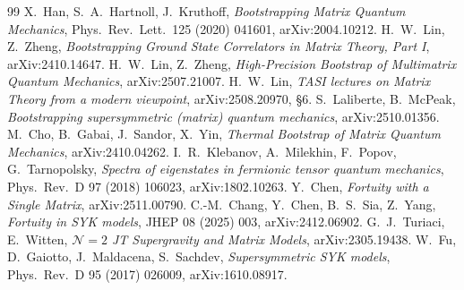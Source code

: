 \documentclass[10pt,a4paper]{article}
\begin{document}
\begin{thebibliography}{99}\small
{} X.~Han, S.~A.~Hartnoll, J.~Kruthoff, \emph{Bootstrapping Matrix Quantum Mechanics}, Phys.\ Rev.\ Lett.\ 125 (2020) 041601, arXiv:2004.10212.
 H.~W.~Lin, Z.~Zheng, \emph{Bootstrapping Ground State Correlators in Matrix Theory, Part I}, arXiv:2410.14647.
 H.~W.~Lin, Z.~Zheng, \emph{High-Precision Bootstrap of Multimatrix Quantum Mechanics}, arXiv:2507.21007.
 H.~W.~Lin, \emph{TASI lectures on Matrix Theory from a modern viewpoint}, arXiv:2508.20970, \S6.
 S.~Laliberte, B.~McPeak, \emph{Bootstrapping supersymmetric (matrix) quantum mechanics}, arXiv:2510.01356.
 M.~Cho, B.~Gabai, J.~Sandor, X.~Yin, \emph{Thermal Bootstrap of Matrix Quantum Mechanics}, arXiv:2410.04262.
 I.~R.~Klebanov, A.~Milekhin, F.~Popov, G.~Tarnopolsky, \emph{Spectra of eigenstates in fermionic tensor quantum mechanics}, Phys.\ Rev.\ D 97 (2018) 106023, arXiv:1802.10263.
 Y.~Chen, \emph{Fortuity with a Single Matrix}, arXiv:2511.00790.
 C.-M.~Chang, Y.~Chen, B.~S.~Sia, Z.~Yang, \emph{Fortuity in SYK models}, JHEP 08 (2025) 003, arXiv:2412.06902.
 G.~J.~Turiaci, E.~Witten, \emph{$\mathcal N=2$ JT Supergravity and Matrix Models}, arXiv:2305.19438.
 W.~Fu, D.~Gaiotto, J.~Maldacena, S.~Sachdev, \emph{Supersymmetric SYK models}, Phys.\ Rev.\ D 95 (2017) 026009, arXiv:1610.08917.
\end{thebibliography}
\end{document}
